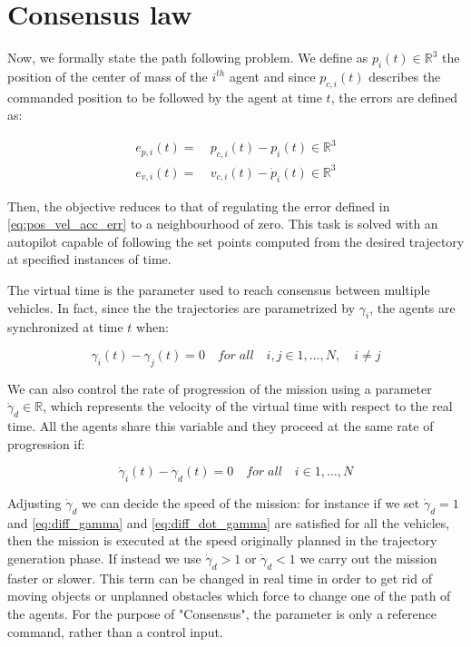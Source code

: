 \section{Consensus law\label{sec:consensus_law}}

Now, we formally state the path following problem. We define as $p_i(t) \in \mathbb{R}^3$
the position of the center of mass of the $i^{th}$ agent and since $p_{c,i}(t)$
describes the commanded position to be followed by the agent at time $t$, the errors
are defined as:

\begin{equation}  \label{eq:pos_vel_acc_err}
  \begin{aligned}
  e_{p,i}(t) = \ & p_{c,i}(t) - p_i(t) \in  \mathbb{R}^3\\
  e_{v,i}(t) = \ & v_{c,i}(t) - \dot{p}_i(t) \in  \mathbb{R}^3
  \end{aligned}
\end{equation}

Then, the objective reduces to that of regulating the error defined in \eqref{eq:pos_vel_acc_err}
to a neighbourhood of zero.
This task is solved with an autopilot capable of following the set points computed
from the desired trajectory at specified instances of time.

The virtual time is the parameter used to reach consensus between multiple vehicles.
In fact, since the the trajectories are parametrized by $\gamma_i$, the agents are
synchronized at time $t$ when:

\begin{equation} \label{eq:diff_gamma}
  \gamma_i(t) - \gamma_j(t) = 0 \quad for \; all \quad i,j \in {1 , \dots , N}, \quad i \neq j
\end{equation}

We can also control the rate of progression of the mission using a parameter
$\dot{\gamma}_d \in \mathbb{R}$, which represents the velocity of the virtual time
with respect to the real time. All the agents share this variable and they proceed
at the same rate of progression if:

\begin{equation} \label{eq:diff_dot_gamma}
  \dot{\gamma}_i(t) - \dot{\gamma}_d(t) = 0 \quad for \; all \quad i \in {1 , \dots , N}
\end{equation}

Adjusting $\dot{\gamma}_d$ we can decide the speed of the mission: for instance
if we set $\dot{\gamma}_d = 1$ and \eqref{eq:diff_gamma} and \eqref{eq:diff_dot_gamma}
are satisfied for all the vehicles, then the mission is executed at the speed
originally planned in the trajectory generation phase.
If instead we use $\dot{\gamma}_d > 1$ or $\dot{\gamma}_d < 1$ we carry out the
mission faster or slower.
This term can be changed in real time in order to get rid of moving objects or
unplanned obstacles which force to change one of the path of the agents.
For the purpose of "Consensus", the parameter is only a reference command,
rather than a control input.

